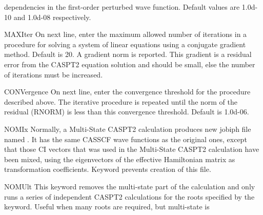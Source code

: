\begin{keywordlist}
dependencies in the first-order perturbed wave function. Default
values are 1.0d-10 and 1.0d-08 respectively.
\item[MAXIter]
On next line, enter the maximum allowed number of iterations
in a procedure for solving a system of
linear equations using a conjugate gradient method. Default is 20.
A gradient norm is reported. This gradient is a residual error from the
CASPT2 equation solution and should be small, else the number of iterations
must be increased.
\item[CONVergence]
On next line, enter the convergence threshold for the procedure described above.
The iterative procedure is repeated until the norm of the residual
(RNORM) is less than this convergence threshold. Default is 1.0d-{}06.
\item[NOMIx]
Normally, a Multi-State CASPT2 calculation produces new jobiph file named
. It has the same CASSCF wave functions as the original ones, except
that those CI vectors that was used in the Multi-State CASPT2 calculation
have been mixed, using the eigenvectors of the effective Hamiltonian matrix
as transformation coefficients.
Keyword  prevents creation of this  file.
\item[NOMUlt]
This keyword removes the multi-state part of the calculation and only runs a
series of independent CASPT2 calculations for the roots specified by the
 keyword. Useful when many roots are required, but multi-state is

\end{keywordlist}
